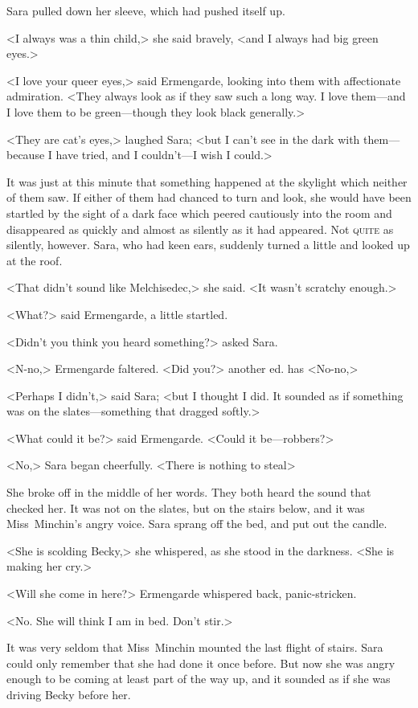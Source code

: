 Sara pulled down her sleeve, which had pushed itself up.

<I always was a thin child,> she said bravely, <and I always had big green eyes.>

<I love your queer eyes,> said Ermengarde, looking into them with affectionate admiration. <They always look as if they saw such a long way. I love them—and I love them to be green—though they look black generally.>

<They are cat's eyes,> laughed Sara; <but I can't see in the dark with them—because I have tried, and I couldn't—I wish I could.>

It was just at this minute that something happened at the skylight which neither of them saw. If either of them had chanced to turn and look, she would have been startled by the sight of a dark face which peered cautiously into the room and disappeared as quickly and almost as silently as it had appeared. Not \textsc{quite} as silently, however. Sara, who had keen ears, suddenly turned a little and looked up at the roof.

<That didn't sound like Melchisedec,> she said. <It wasn't scratchy enough.>

<What?> said Ermengarde, a little startled.

<Didn't you think you heard something?> asked Sara.

<N-no,> Ermengarde faltered. <Did you?> {another ed. has <No-no,>}

<Perhaps I didn't,> said Sara; <but I thought I did. It sounded as if something was on the slates—something that dragged softly.>

<What could it be?> said Ermengarde. <Could it be—robbers?>

<No,> Sara began cheerfully. <There is nothing to steal\longdash>

She broke off in the middle of her words. They both heard the sound that checked her. It was not on the slates, but on the stairs below, and it was Miss~Minchin's angry voice. Sara sprang off the bed, and put out the candle.

<She is scolding Becky,> she whispered, as she stood in the darkness. <She is making her cry.>

<Will she come in here?> Ermengarde whispered back, panic-stricken.

<No. She will think I am in bed. Don't stir.>

It was very seldom that Miss~Minchin mounted the last flight of stairs. Sara could only remember that she had done it once before. But now she was angry enough to be coming at least part of the way up, and it sounded as if she was driving Becky before her.

